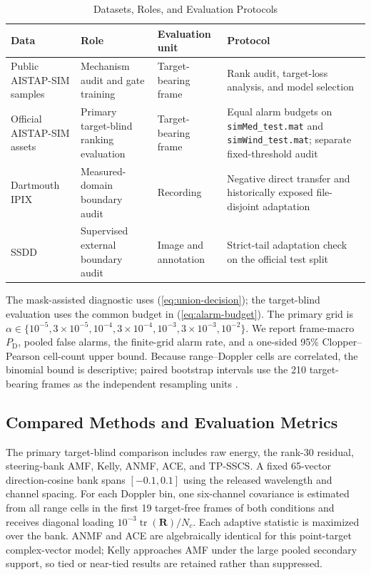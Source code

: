 \documentclass[journal]{IEEEtran}
\begin{document}
\begin{table}[!t]
\caption{Datasets, Roles, and Evaluation Protocols}
\label{tab:experimental-data}
\centering
\footnotesize
\setlength{\tabcolsep}{4.0pt}
\renewcommand{\arraystretch}{1.10}
\begin{tabularx}{\textwidth}{@{}p{}p{}p{}X@{}}
\toprule
Data & Role & Evaluation unit & Protocol \\
\midrule
Public AISTAP-SIM samples & Mechanism audit and gate training & Target-bearing frame & Rank audit, target-loss analysis, and model selection \\
Official AISTAP-SIM assets & Primary target-blind ranking evaluation & Target-bearing frame & Equal alarm budgets on \texttt{simMed\_test.mat} and \texttt{simWind\_test.mat}; separate fixed-threshold audit \\
Dartmouth IPIX & Measured-domain boundary audit & Recording & Negative direct transfer and historically exposed file-disjoint adaptation \\
SSDD & Supervised external boundary audit & Image and annotation & Strict-tail adaptation check on the official test split \cite{wang2019ssdd,zhang2021ssdd} \\
\bottomrule
\end{tabularx}
\end{table}

The mask-assisted diagnostic uses (\ref{eq:union-decision}); the target-blind evaluation uses the common budget in (\ref{eq:alarm-budget}). The primary grid is $\alpha\in\{10^{-5},3\times10^{-5},10^{-4},3\times10^{-4},10^{-3},3\times10^{-3},10^{-2}\}$. We report frame-macro $P_{\mathrm{D}}$, pooled false alarms, the finite-grid alarm rate, and a one-sided 95\% Clopper--Pearson cell-count upper bound. Because range--Doppler cells are correlated, the binomial bound is descriptive; paired bootstrap intervals use the 210 target-bearing frames as the independent resampling units \cite{efron1979bootstrap}.

\subsection{Compared Methods and Evaluation Metrics}

The primary target-blind comparison includes raw energy, the rank-30 residual, steering-bank AMF, Kelly, ANMF, ACE, and TP-SSCS. A fixed 65-vector direction-cosine bank spans $[-0.1,0.1]$ using the released wavelength and channel spacing. For each Doppler bin, one six-channel covariance is estimated from all range cells in the first 19 target-free frames of both conditions and receives diagonal loading $10^{-3}\operatorname{tr}(\bm{R})/N_c$. Each adaptive statistic is maximized over the bank. ANMF and ACE are algebraically identical for this point-target complex-vector model; Kelly approaches AMF under the large pooled secondary support, so tied or near-tied results are retained rather than suppressed.
\end{document}
